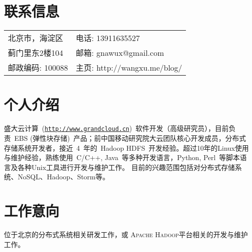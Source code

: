 \documentclass[margin,line]{res}
\newcommand{\http}{http:/\hspace{-0.3ex}/}
\begin{document}

\begin{resume}
\section{联系信息}
\vspace{.05in}
\begin{tabular}{@{}p{2in}|p{3in}}
北京市，海淀区 	   & \textsf{电话:} {13911635527}\\         
蓟门里东2楼104     & \textsf{邮箱:} {gnawux@gmail.com}\\       
邮政编码: 100088   & \textsf{主页:} {\http{}wangxu.me/blog/}\\
\end{tabular}

\section{个人介绍}

盛大云计算~(\href{http://www.grandcloud.cn}{\tt \http{}www.grandcloud.cn})~软件开发（高级研究员），目前负责~EBS (弹性块存储)~产品；前中国移动研究院大云团队核心开发成员，分布式存储系统开发者，接近~4~年的~Hadoop HDFS~开发经验。超过10年的Linux使用与维护经验，熟练使用~C/C++, Java~等多种开发语言，Python, Perl~等脚本语言及各种Unix工具进行开发与维护工作。 目前的兴趣范围包括对分布式存储系统、NoSQL、Hadoop、Storm等。

\section{工作意向}

位于北京的分布式系统相关研发工作，或\textsc{ Apache Hadoop}平台相关的开发与维护工作。


\end{resume}
\end{document}
